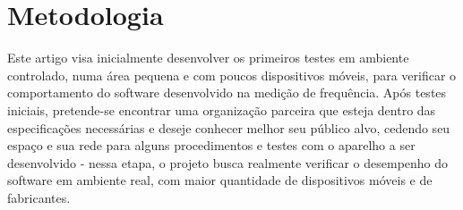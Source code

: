 
\chapter{Metodologia}
\label{metodologia}

Este artigo visa inicialmente desenvolver os primeiros testes em ambiente controlado, numa área pequena e com poucos dispositivos móveis, para verificar o comportamento do software desenvolvido na medição de  frequência. Após testes iniciais, pretende-se encontrar uma organização parceira que esteja dentro das especificações necessárias e deseje conhecer melhor seu público alvo, cedendo seu espaço e sua rede para alguns procedimentos e testes com o aparelho a ser desenvolvido - nessa etapa, o projeto busca realmente verificar o desempenho do software em ambiente real, com maior quantidade de dispositivos móveis e de fabricantes. 
 